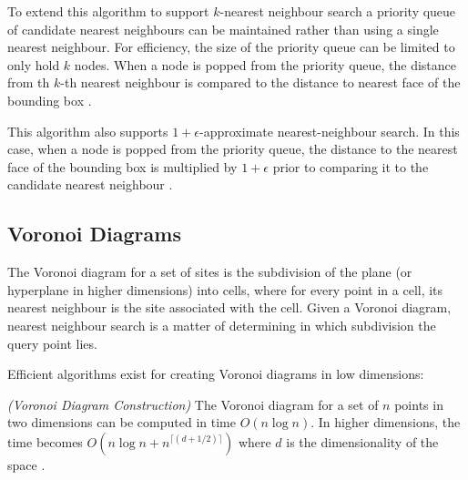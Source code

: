 \documentclass[mcs]{scsthesis}
\begin{document}
To extend this algorithm to support \(k\)-nearest neighbour search a priority
queue of candidate nearest neighbours can be maintained rather than using a
single nearest neighbour. For efficiency, the size of the priority queue can be
limited to only hold \(k\) nodes. When a node is popped from the
priority queue, the distance from th \(k\)-th nearest neighbour is compared to
the distance to nearest face of the bounding box \cite{samet}.

This algorithm also supports \(1 + \epsilon\)-approximate nearest-neighbour
search. In this case, when a node is popped from the priority queue, the
distance to the nearest face of the bounding box is multiplied by
\(1 + \epsilon\) prior to comparing it to the candidate nearest neighbour
\cite{samet}.

\subsection{Voronoi Diagrams}

The Voronoi diagram for a set of sites is the subdivision of the plane (or
hyperplane in higher dimensions) into cells, where for every point in a cell,
its nearest neighbour is the site associated with the cell. Given a Voronoi
diagram, nearest neighbour search is a matter of determining in which
subdivision the query point lies.

Efficient algorithms exist for creating Voronoi diagrams in low dimensions:

\begin{thm} \emph{(Voronoi Diagram Construction)}
The Voronoi diagram for a set of $n$ points in two dimensions can be computed
in time \(O(n \log n)\). In higher dimensions, the time becomes
\(O(n \log n + n^{\lceil(d+1/2)\rceil})\) where $d$ is the dimensionality of the
space \cite{dutch}.
\end{thm}
\end{document}
